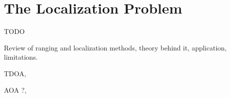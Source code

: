 %
%

\section{The Localization Problem}
\label{chapter:problem}


TODO

Review of ranging and localization methods, theory behind it, application, limitations. 

 
TDOA,

AOA ?,

